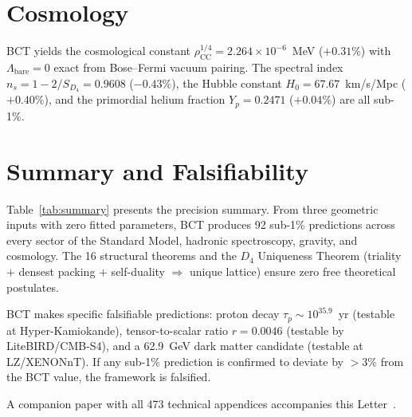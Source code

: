 \documentclass[aps,prl,reprint,superscriptaddress,showpacs]{revtex4-2}
\begin{document}
\section{Cosmology}

BCT yields the cosmological constant $\rho_{\mathrm{CC}}^{1/4} =
2.264 \times 10^{-6}$~MeV ($+0.31\%$) with $\Lambda_{\mathrm{bare}} = 0$
exact from Bose--Fermi vacuum pairing. The spectral index
$n_s = 1 - 2/S_{D_4} = 0.9608$ ($-0.43\%$),
the Hubble constant $H_0 = 67.67$~km/s/Mpc ($+0.40\%$),
and the primordial helium fraction $Y_p = 0.2471$ ($+0.04\%$)
are all sub-1\%.

\section{Summary and Falsifiability}

Table~\ref{tab:summary} presents the precision summary.
From three geometric inputs with zero fitted parameters,
BCT produces 92 sub-1\% predictions across every sector
of the Standard Model, hadronic spectroscopy, gravity, and cosmology.
The 16 structural theorems and the $D_4$ Uniqueness Theorem
(triality $+$ densest packing $+$ self-duality $\Rightarrow$ unique lattice)
ensure zero free theoretical postulates.

BCT makes specific falsifiable predictions:
proton decay $\tau_p \sim 10^{35.9}$~yr (testable at Hyper-Kamiokande),
tensor-to-scalar ratio $r = 0.0046$ (testable by LiteBIRD/CMB-S4),
and a 62.9~GeV dark matter candidate (testable at LZ/XENONnT).
If any sub-1\% prediction is confirmed to deviate by $>3\%$
from the BCT value, the framework is falsified.

A companion paper with all 473 technical appendices accompanies
this Letter~\cite{BCTcompanion}.
\end{document}
